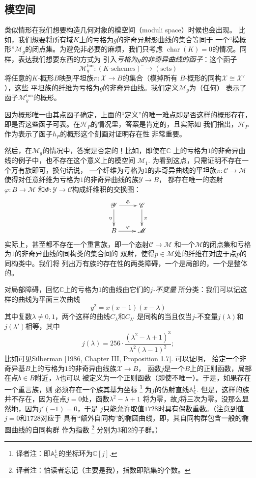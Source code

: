 \subsection{模空间}\label{s:6.2.4}

类似情形在我们想要构造几何对象的模空间（moduli space）时候也会出现。
比如，我们想要将所有域$K$上的亏格为$g$的非奇异射影曲线的集合等同于
一个“模概形”$\mathscr M_g$的闭点集。为避免非必要的麻烦，我们只考虑
$\operatorname{char}(K)=0$的情况。同样，表达我们想要东西的方式为
引入\emph{亏格为$g$的非奇异曲线的函子}：这个函子
\[
    \mathscr M_g^{\text{fun}}:(\text{$K$-schemes})^\circ \to 
    (\text{sets})
\]
将任意的$K$-概形$B$映到平坦族$\pi:\mathscr X\to B$的集合（模掉所有
$B$-概形的同构$\mathscr X\cong \mathscr X'$），这些
平坦族的纤维为亏格为$g$的非奇异曲线。我们定义$\mathscr M_g$为（任何）
表示了函子$\mathscr M_g^{\text{fun}}$的概形。

因为概形唯一由其点函子确定，上面的“定义”的唯一难点即是否这样的概形存在，
即是否这些函子可表。在$\mathscr H_P$的情况里，答案是肯定的，且实际如
我们指出，$\mathscr H_P$作为表示了函子$h_P$的概形这个刻画对证明存在性
非常重要。


然后，在$\mathscr M_g$的情况中，答案是否定的！比如，即使在$\mathbb C$
上的亏格为$1$的非奇异曲线的例子中，也不存在这个意义上的模空间
$\mathscr M_1$. 为看到这点，只需证明不存在一个万有族即可，换句话说，
一个纤维为亏格为$1$的非奇异曲线的平坦族$\pi:\mathscr C\to \mathscr M$
使得对任意纤维为亏格为$1$的非奇异曲线的族$\mathscr Y\to B$，
都存在唯一的态射$\varphi:B\to \mathscr M$
和$\Phi:\mathscr Y\to \mathscr C$构成纤维积的交换图：
\[
    \xymatrix{
        \mathscr Y\ar[r]^\Phi \ar[d]_\eta & \mathscr C\ar[d]^\pi\\
        B \ar[r]^\varphi & \mathscr M
    }
\]
实际上，甚至都不存在一个重言族，即一个态射$\mathscr C\to\mathscr M$
和一个$\mathscr M$的闭点集和亏格为$1$的非奇异曲线的同构类的集合间的
双射，使得$p\in \mathscr M$处的纤维在对应于点$p$的同构类中。我们将
列出万有族的存在性的两类障碍，一个是局部的，一个是整体的。

对局部障碍，回忆$\mathbb C$上的亏格为$1$的曲线由它们的\emph{$j$-不变量}
所分类：我们可以记这样的曲线为平面三次曲线
\[
    y^2=x(x-1)(x-\lambda)
\]
其中复数$\lambda \neq 0,1$，两个这样的曲线$C_\lambda$和$C_{\lambda'}$
是同构的当且仅当$j$-不变量$j(\lambda)$和$j(\lambda')$相等，其中
\[
    j(\lambda)=256\cdot \frac{(\lambda^2-\lambda+1)^3}
    {\lambda^2(\lambda-1)^2};
\]
比如可见Silberman [1986, Chapter III, Proposition 1.7]. 可以证明，
给定一个非奇异基$B$上的亏格为$1$的非奇异曲线族$\mathscr X\to B$，
函数$j$是一个$B$上的正则函数，局部在点$b\in B$附近，$\lambda$也可以
被定义为一个正则函数（即使不唯一）。于是，如果存在一个重言族，则
必须存在一个族其基为坐标%
\footnote{译者注：即$\mathbb A_{\mathbb C}^1$的坐标环为$\mathbb C[j]$.}%
为$j$的仿射直线$\mathbb A_{\mathbb C}^1$.
但是，这样的族并不存在，因为在点$j=0$处，函数$\lambda^2-\lambda+1$
将为零，故$j$将三次为零。没那么显然地，因为$j'(-1)=0$，于是
$j$只能允许取值$1728$时具有偶数重数。（注意到值$j=0$和$1728$对应于
具有“额外自同构”的椭圆曲线，即，其自同构群包含一般的椭圆曲线的自同构群
作为指数%
\footnote{译者注：怕读者忘记（主要是我），指数即陪集的个数。}%
分别为$3$和$2$的子群。）


